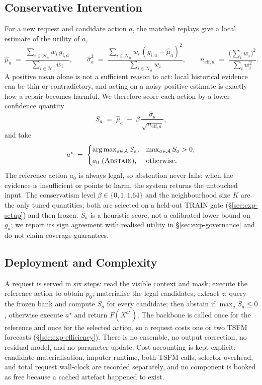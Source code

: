 \documentclass{article}
\newcommand{\tsfm}{TSFM}
\newcommand{\calA}{\mathcal{A}}
\newcommand{\calN}{\mathcal{N}}
\begin{document}
\subsection{Conservative Intervention}
\label{sec:method-gate}
For a new request and candidate action $a$, the matched replays give a local estimate of
the utility of $a$,
\begin{equation}
  \hat\mu_a \;=\; \frac{\sum_{i \in \calN_a} w_i\, g_{i,a}}{\sum_{i \in \calN_a} w_i},
  \qquad
  \hat\sigma_a^2 \;=\; \frac{\sum_{i \in \calN_a} w_i\,(g_{i,a} - \hat\mu_a)^2}{\sum_{i \in \calN_a} w_i},
  \qquad
  n_{\mathrm{eff},a} \;=\; \frac{\bigl(\sum_i w_i\bigr)^2}{\sum_i w_i^2} .
  \label{eq:local-mean}
\end{equation}
A positive mean alone is not a sufficient reason to act: local historical evidence can be
thin or contradictory, and acting on a noisy positive estimate is exactly how a repair
becomes harmful. We therefore score each action by a lower-confidence quantity
\begin{equation}
  S_a \;=\; \hat\mu_a \;-\; \beta\,\frac{\hat\sigma_a}{\sqrt{n_{\mathrm{eff},a}}},
  \label{eq:conservative-score}
\end{equation}
and take
\begin{equation}
  a^\star \;=\;
  \begin{cases}
    \arg\max_{a \in \calA} S_a, & \max_{a \in \calA} S_a > 0,\\[2pt]
    a_0 \ (\textsc{Abstain}),   & \text{otherwise}.
  \end{cases}
  \label{eq:act-abstain}
\end{equation}
The reference action $a_0$ is always legal, so abstention never fails: when the evidence
is insufficient or points to harm, the system returns the untouched input. The
conservatism level $\beta \in \{0, 1, 1.64\}$ and the neighbourhood size $K$ are the only
tuned quantities; both are selected on a held-out TRAIN gate (\S\ref{sec:exp-setup}) and
then frozen. $S_a$ is a heuristic score, not a calibrated lower bound on $g_a$; we report
its sign agreement with realised utility in \S\ref{sec:exp-governance} and do not claim
coverage guarantees.

\subsection{Deployment and Complexity}
\label{sec:method-deploy}
A request is served in six steps: read the visible context and mask; execute the reference
action to obtain $p_0$; materialise the legal candidates; extract $z$; query the frozen bank
and compute $S_a$ for every candidate; then abstain if $\max_a S_a \le 0$, otherwise
execute $a^\star$ and return $F(X^{a^\star})$. The backbone is called once for the
reference and once for the selected action, so a request costs one or two \tsfm{} forecasts
(\S\ref{sec:exp-efficiency}). There is no ensemble, no output correction, no residual
model, and no parameter update. Cost accounting is kept explicit: candidate
materialisation, imputer runtime, both \tsfm{} calls, selector overhead, and total request
wall-clock are recorded separately, and no component is booked as free because a cached
artefact happened to exist.
\end{document}
